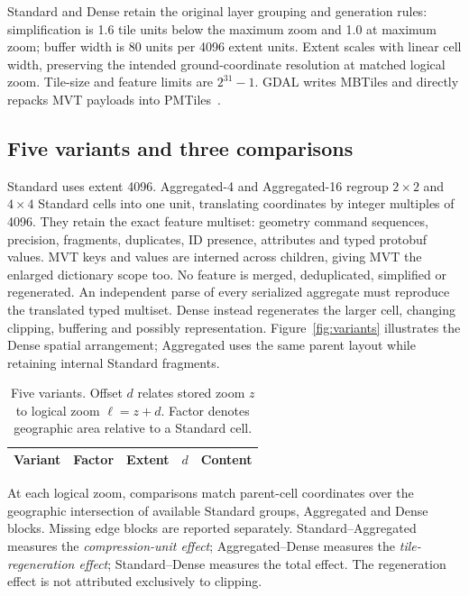 Standard and Dense retain the original layer grouping and generation rules:
simplification is 1.6 tile units below the maximum zoom and 1.0 at maximum zoom;
buffer width is 80 units per 4096 extent units. Extent scales with linear cell width,
preserving the intended ground-coordinate resolution at matched logical zoom.
Tile-size and feature limits are $2^{31}-1$. GDAL writes MBTiles and directly repacks
MVT payloads into PMTiles~\citep{gdal_mvt,pmtiles_v3}.

\subsection{Five variants and three comparisons}\label{sec:granularity}
Standard uses extent 4096. Aggregated-4 and Aggregated-16 regroup $2\times2$ and
$4\times4$ Standard cells into one unit, translating coordinates by integer multiples
of 4096. They retain the exact feature multiset: geometry command sequences, precision,
fragments, duplicates, ID presence, attributes and typed protobuf values. MVT keys and
values are interned across children, giving MVT the enlarged dictionary scope too.
No feature is merged, deduplicated, simplified or regenerated. An independent parse
of every serialized aggregate must reproduce the translated typed multiset.
Dense instead regenerates the larger cell, changing clipping, buffering and possibly
representation. Figure~\ref{fig:variants} illustrates the Dense spatial arrangement;
Aggregated uses the same parent layout while retaining internal Standard fragments.

\begin{table}[!tbp]\centering\small
\caption{Five variants. Offset $d$ relates stored zoom $z$ to logical zoom
$\ell=z+d$. Factor denotes geographic area relative to a Standard cell.}
\label{tab:variants}\setlength{\tabcolsep}{3pt}
\begin{tabular}{@{}lrrrl@{}}\toprule
Variant & Factor & Extent & $d$ & Content\\
\midrule\end{tabular}\end{table}


At each logical zoom, comparisons match parent-cell coordinates over the geographic
intersection of available Standard groups, Aggregated and Dense blocks. Missing
edge blocks are reported separately. Standard--Aggregated measures the
\emph{compression-unit effect}; Aggregated--Dense measures the
\emph{tile-regeneration effect}; Standard--Dense measures the total effect.
The regeneration effect is not attributed exclusively to clipping.

